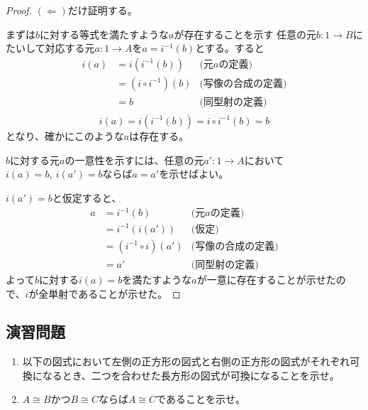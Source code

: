 \documentclass[dvipdfmx]{jsarticle}
\newcommand{\arrow}{\rightarrow}
\newcommand{\mor}[3]{#1:#2\arrow #3}
\newtheorem{proof}{証明}[section]
\numberwithin{proof}{subsection}
\numberwithin{prop}{subsection}
\numberwithin{define}{subsection}
\begin{document}
	\begin{proof}
		$(\Longleftarrow)$だけ証明する。


		まずは$b$に対する等式を満たすような$a$が存在することを示す
		任意の元$\mor{b}{1}{B}$にたいして対応する元$\mor{a}{1}{A}$を$a=i^{-1}(b)$とする。すると
		\begin{align*}
			i(a)&=i(i^{-1}(b))&\text{(元$a$の定義)}\\
			&=(i\circ i^{-1})(b)&\text{(写像の合成の定義)}\\
			&=b&\text{(同型射の定義)}\\
		\end{align*}
		\[i(a)=i(i^{-1}(b))=i\circ i^{-1}(b)=b\]となり、確かにこのような$a$は存在する。

		$b$に対する元$a$の一意性を示すには、任意の元$\mor{a'}{1}{A}$において$i(a)=b,\ i(a')=b$ならば$a=a'$を示せばよい。

		$i(a')=b$と仮定すると、
		\begin{align*}
			a&=i^{-1}(b)&\text{(元$a$の定義)}\\
			　&=i^{-1}(i(a'))&\text{(仮定)}\\
			　&=(i^{-1}\circ i)(a')&\text{(写像の合成の定義)}\\
			　&=a'&\text{(同型射の定義)}
		\end{align*}
		よって$b$に対する$i(a)=b$を満たすような$a$が一意に存在することが示せたので、$i$が全単射であることが示せた。
	\end{proof}
	\subsection{演習問題}
	\begin{enumerate}
		\item 以下の図式において左側の正方形の図式と右側の正方形の図式がそれぞれ可換になるとき、二つを合わせた長方形の図式が可換になることを示せ。
			\begin{center}
			\end{center}
		\item $A\cong B$かつ$B\cong C$ならば$A\cong C$であることを示せ。
	\end{enumerate}
\end{document}
